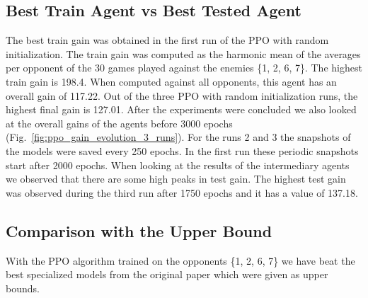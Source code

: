\documentclass[conference]{IEEEtran}
\begin{document}
    \subsection{Best Train Agent vs Best Tested Agent}\label{subsec:best-tested-agent}
    The best train gain was obtained in the first run of the PPO with random initialization.
    The train gain was computed as the harmonic mean of the averages per opponent of the 30 games played against
    the enemies \{1, 2, 6, 7\}.
    The highest train gain is 198.4.
    When computed against all opponents, this agent has an overall gain of 117.22.
    Out of the three PPO with random initialization runs, the highest final gain is 127.01.
    After the experiments were concluded we also looked at the overall gains of the agents before 3000 epochs (Fig.~\ref{fig:ppo_gain_evolution_3_runs}).
    For the runs 2 and 3 the snapshots of the models were saved every 250 epochs.
    In the first run these periodic snapshots start after 2000 epochs.
    When looking at the results of the intermediary agents we observed that there are some high peaks in test gain.
    The highest test gain was observed during the third run after 1750 epochs and it has a value of 137.18.

    \subsection{Comparison with the Upper Bound}\label{subsec:comparison-with-the-upper-bound}
    With the PPO algorithm trained on the opponents \{1, 2, 6, 7\} we have
    beat the best specialized models from the original paper which were given as upper bounds\cite{evoman}.
\end{document}
